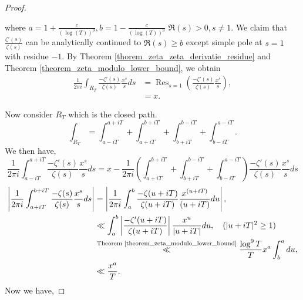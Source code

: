 \documentclass{article}
\DeclareMathOperator{\Res}{Res}
\begin{document}
\begin{proof}
\begin{center}
\end{center}
\par where $a = 1+{\frac c {(\log(T))^9}},b = 1-{\frac c {(\log(T))^9}}$ $\Re(s)>0,s\not=1$. %
We claim that ${\frac {\zeta'(s)} {\zeta(s)}}$ can be analytically continued to $\Re(s)\geq b$ except simple pole at $s=1$ with residue $-1$. By Theorem \ref{thorem_zeta_zeta_derivatie_residue} and Theorem \ref{theorem_zeta_modulo_lower_bound}, we obtain
\begin{align*}
  {\frac 1 {2\pi i}}\int_{R_T}{\frac {-\zeta'(s)} {\zeta(s)}}{\frac {x^s} s}ds & = \Res_{s=1}\left({\frac {-\zeta'(s)} {\zeta(s)}}{\frac {x^s} s}\right),\\
  & = x.
\end{align*}
\par Now consider $R_T$ which is the closed path.
\begin{equation*}
  \int_{R_T} = \int_{a-iT}^{a+iT}+\int_{a+iT}^{b+iT}+\int_{b+iT}^{b-iT}+\int_{b-iT}^{a-iT}.
\end{equation*}
We then have,
\begin{equation*}
  {\frac 1 {2\pi i}}\int_{a-iT}^{a+iT} {\frac {-\zeta'(s)} {\zeta(s)}}{\frac {x^s} {s}}ds = x -{\frac 1 {2\pi i}}\left(\int_{a+iT}^{b+iT}+\int_{b+iT}^{b-iT}+\int_{b-iT}^{a-iT}\right) {\frac {-\zeta'(s)} {\zeta(s)}}{\frac {x^s} {s}}ds 
\end{equation*}
\begin{align*}
  \left\vert{\frac 1 {2\pi i}}\int_{a+iT}^{b+iT}{\frac {-\zeta(s)}{\zeta(s)}}{\frac {x^s} {s}}ds\right\vert &= \left\vert{\frac 1 {2\pi i}}\int_a^b{\frac {-\zeta(u+iT)}{\zeta(u+iT)}}{\frac {x^{(u+iT)}} {(u+iT)}}du\right\vert,\\
  & \ll \int_a^b\left\vert{\frac {-\zeta'(u+iT)} {\zeta(u+iT)}}\right\vert{\frac {x^u} {\vert u+iT\vert}}du,\quad(\vert u+iT\vert^2\geq1)\\
  &\stackrel{\text{Theorem \ref{theorem_zeta_modulo_lower_bound}}}{\ll }{\frac {\log^9T} T}x^a\int_b^a du,\\
  &\ll {\frac {x^a} T}.
\end{align*}
Now we have,

\end{proof}
\end{document}
